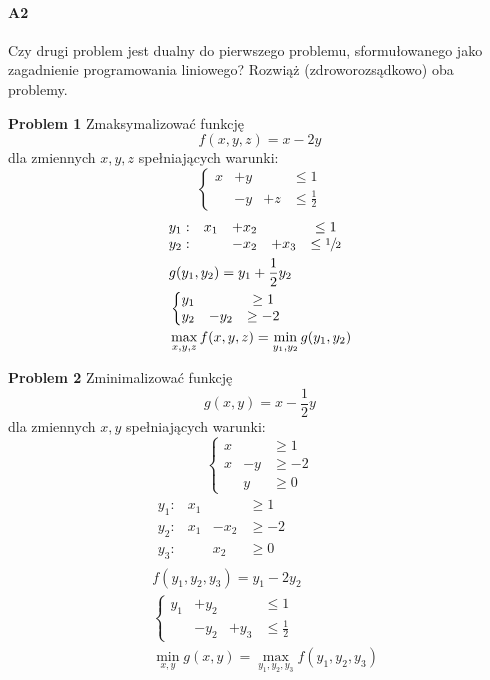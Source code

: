\paragraph{A2} Czy drugi problem jest dualny do pierwszego problemu, sformułowanego jako zagadnienie programowania liniowego? Rozwiąż (zdroworozsądkowo) oba problemy.

\begin{minipage}{.5\textwidth}
\textbf{Problem 1} Zmaksymalizować funkcję
$$f(x, y, z) = x - 2y$$
dla zmiennych $x, y, z$ spełniających warunki:
$$\left\{\begin{matrix}
x &+ y &&\leq 1\\
&-y &+ z &\leq \frac{1}{2}
\end{matrix}\right.$$
\begin{align*}
&\begin{matrix}
y_1: & x_1 &+x_2& &\leq 1\\
y_2: & &-x_2&+x_3 &\leq \sfrac{1}{2}
\end{matrix}\\
&g(y_1,y_2)=y_1+\frac{1}{2}y_2\\
&\left\{\begin{matrix}
y_1&&\geq 1\\
y_2&-y_2&\geq -2
\end{matrix}\right.\\
&\max _{x,y,z}f(x,y,z)=\min _{y_1,y_2}g(y_1,y_2)
\end{align*}
\end{minipage}%
\begin{minipage}{.5\textwidth}
\textbf{Problem 2} Zminimalizować funkcję
$$g(x, y) = x - \frac{1}{2}y$$
dla zmiennych $x, y$ spełniających warunki:
$$\left\{\begin{matrix}
x &&\geq 1\\
x &- y &\geq -2\\
&y &\geq 0
\end{matrix}\right.$$
\begin{align*}
&\begin{matrix}
y_1: & x_1 & &\geq 1\\
y_2: & x_1 &-x_2 &\geq -2\\
y_3: & & x_2 &\geq 0
\end{matrix}\\
&f(y_1,y_2,y_3)=y_1-2y_2\\
&\left\{\begin{matrix}
y_1	&+y_2	&		&\leq 1\\
	&-y_2	&+y_3	&\leq \frac{1}{2}
\end{matrix}\right.\\
&\min _{x,y}g(x,y)=\max _{y_1,y_2,y_3}f(y_1,y_2,y_3)
\end{align*}
\end{minipage}




